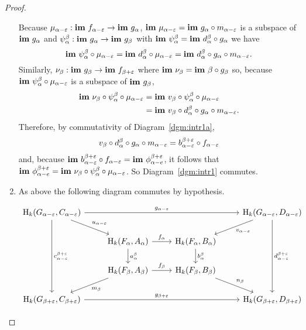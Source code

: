 \begin{proof}
\begin{enumerate}[label=\Roman*.]
    Because $\mu_{\alpha-\varepsilon} : \mathbf{im}~f_{\alpha-\varepsilon}\to\mathbf{im}~g_\alpha$, $\mathbf{im}~\mu_{\alpha-\varepsilon} = \mathbf{im}~g_\alpha\circ m_{\alpha-\varepsilon}$ is a subspace of $\mathbf{im}~g_\alpha$ and $\psi_\alpha^\beta : \mathbf{im}~g_\alpha\to \mathbf{im}~g_\beta$ with $\mathbf{im}~\psi_\alpha^\beta = \mathbf{im}~d_\alpha^\beta\circ g_\alpha$ we have
    \[ \mathbf{im}~\psi_\alpha^\beta\circ \mu_{\alpha-\varepsilon} = \mathbf{im}~d_\alpha^\beta \circ \mu_{\alpha-\varepsilon} = \mathbf{im}~d_\alpha^\beta\circ g_\alpha\circ m_{\alpha-\varepsilon}.\]
    Similarly, $\nu_\beta : \mathbf{im}~g_\beta \to \mathbf{im}~f_{\beta + \varepsilon}$ where $\mathbf{im}~\nu_\beta = \mathbf{im}~\beta\circ g_\beta$ so, because $\mathbf{im}~\psi_\alpha^\beta\circ\mu_{\alpha-\varepsilon}$ is a subspace of $\mathbf{im}~g_{\beta}$,
    \begin{align*}
      \mathbf{im}~\nu_\beta\circ\psi_\alpha^\beta\circ\mu_{\alpha-\varepsilon} &= \mathbf{im}~v_\beta\circ\psi_\alpha^\beta \circ\mu_{\alpha-\varepsilon}\\
        &= \mathbf{im}~v_\beta\circ d_\alpha^\beta\circ g_\alpha\circ m_{\alpha-\varepsilon}.
    \end{align*}
    Therefore, by commutativity of Diagram~\ref{dgm:intr1a},
    \[v_\beta\circ d_\alpha^\beta\circ g_\alpha\circ m_{\alpha-\varepsilon} = b_{\alpha-\varepsilon}^{\beta +\varepsilon}\circ f_{\alpha-\varepsilon}\]
    and, because $\mathbf{im}~b_{\alpha-\varepsilon}^{\beta +\varepsilon}\circ f_{\alpha-\varepsilon} = \mathbf{im}~\phi_{\alpha-e}^{\beta+\varepsilon}$, it follows that $\mathbf{im}~\phi_{\alpha-e}^{\beta+\varepsilon} = \mathbf{im}~\nu_\beta\circ\psi_\alpha^\beta\circ\mu_{\alpha-\varepsilon}$.
    So Diagram~\ref{dgm:intr1} commutes.

    \item As above the following diagram commutes by hypothesis.

    \begin{equation}\label{dgm:intr2a}\begin{tikzcd}
      \hom_k(G_{\alpha-\e}, C_{\alpha-\e})  \arrow[to=Ba, "g_{\alpha-\e}"]
                                            \arrow[to=Ca, "u_{\alpha-\e}"]
                                            \arrow[to=Ab, "c_{\alpha-\e}^{\beta +\e}"]
      & & & |[alias=Ba]|
        \hom_k(G_{\alpha - \e}, D_{\alpha-\e})  \arrow[to=Da, "v_{\alpha -\e}"]
                                                \arrow[to=Bb, "d_{\alpha-\e}^{\beta+\e}"] \\
      & |[alias=Ca]|
      \hom_k(F_\alpha, A_\alpha)  \arrow[to=Da, "f_\alpha"]
                                  \arrow[to=Cb, "a_\alpha^\beta"]
      & |[alias=Da]|
        \hom_k(F_\alpha, B_\alpha)  \arrow[to=Db, "b_\alpha^\beta"] & \\
      & |[alias=Cb]|
      \hom_k(F_\beta, A_\beta)  \arrow[to=Ab, "m_\beta"]
                                \arrow[to=Db, "f_\beta"]
      & |[alias=Db]|
        \hom_k(F_\beta, B_\beta)  \arrow[to=Bb, "n_\beta"] & \\
      |[alias=Ab]|
      \hom_k(G_{\beta +\e}, C_{\beta + \e}) \arrow[to=Bb, "g_{\beta+\e}"]
      & & & |[alias=Bb]|
        \hom_k(G_{\beta+\e}, D_{\beta + \e})
    \end{tikzcd}\end{equation}


\end{enumerate}
\end{proof}
